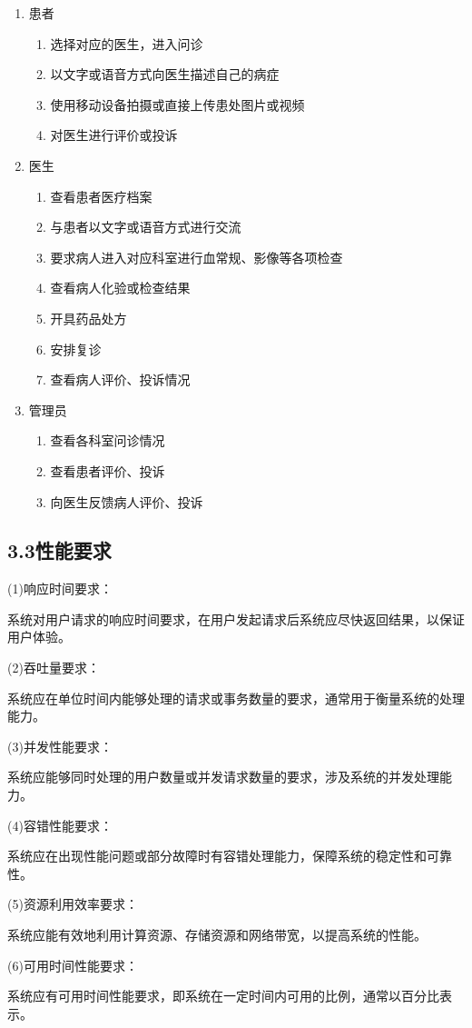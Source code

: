 \documentclass[24pt,a4paper]{article}%
\begin{document}
\begin{enumerate}
	\item 患者
	\begin{enumerate}
		\item 选择对应的医生，进入问诊
		\item 以文字或语音方式向医生描述自己的病症
		\item 使用移动设备拍摄或直接上传患处图片或视频
		\item 对医生进行评价或投诉
	\end{enumerate}
	\item 医生
	\begin{enumerate}
		\item 查看患者医疗档案
		\item 与患者以文字或语音方式进行交流
		\item 要求病人进入对应科室进行血常规、影像等各项检查
		\item 查看病人化验或检查结果
		\item 开具药品处方
		\item 安排复诊
		\item 查看病人评价、投诉情况
	\end{enumerate}
	\item 管理员
	\begin{enumerate}
		\item 查看各科室问诊情况
		\item 查看患者评价、投诉
		\item 向医生反馈病人评价、投诉
	\end{enumerate}
\end{enumerate}


\subsection*{\songti 3.3性能要求}
\noindent (1)响应时间要求：\par 系统对用户请求的响应时间要求，在用户发起请求后系统应尽快返回结果，以保证用户体验。\par
\noindent (2)吞吐量要求：\par 系统应在单位时间内能够处理的请求或事务数量的要求，通常用于衡量系统的处理能力。\par
\noindent (3)并发性能要求：\par 系统应能够同时处理的用户数量或并发请求数量的要求，涉及系统的并发处理能力。\par
\noindent (4)容错性能要求：\par 系统应在出现性能问题或部分故障时有容错处理能力，保障系统的稳定性和可靠性。\par
\noindent (5)资源利用效率要求：\par 系统应能有效地利用计算资源、存储资源和网络带宽，以提高系统的性能。\par
\noindent (6)可用时间性能要求：\par 系统应有可用时间性能要求，即系统在一定时间内可用的比例，通常以百分比表示。\par
\end{document}
